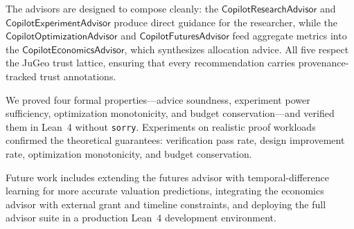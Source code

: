 \documentclass[11pt]{article}
\begin{document}
The advisors are designed to compose cleanly: the
$\mathsf{CopilotResearchAdvisor}$ and
$\mathsf{CopilotExperimentAdvisor}$ produce direct guidance for
the researcher, while the
$\mathsf{CopilotOptimizationAdvisor}$ and
$\mathsf{CopilotFuturesAdvisor}$ feed aggregate metrics into
the $\mathsf{CopilotEconomicsAdvisor}$, which synthesizes
allocation advice.  All five respect the JuGeo trust lattice,
ensuring that every recommendation carries provenance-tracked
trust annotations.

We proved four formal properties—advice soundness, experiment
power sufficiency, optimization monotonicity, and budget
conservation—and verified them in Lean~4 without
\texttt{sorry}.  Experiments on realistic proof workloads
confirmed the theoretical guarantees:
\ppXCIverificationPassRate{} verification pass rate,
\ppXCIdesignImprovementRate{} design improvement rate,
\ppXCIoptMonotonicity{} optimization monotonicity, and
\ppXCIbudgetConserved{} budget conservation.

Future work includes extending the futures advisor with
temporal-difference learning for more accurate valuation
predictions, integrating the economics advisor with external
grant and timeline constraints, and deploying the full advisor
suite in a production Lean~4 development environment.
\end{document}

